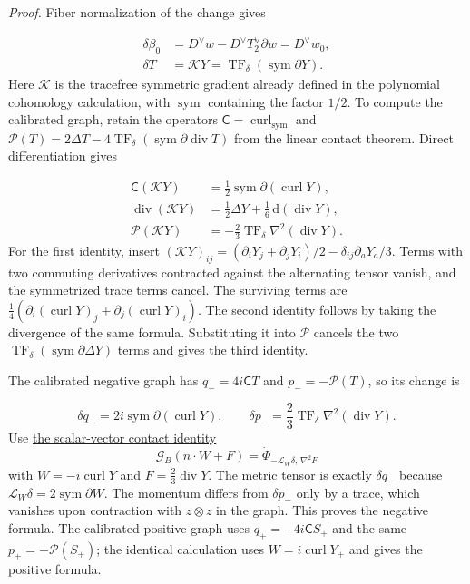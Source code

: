 \documentclass[
  english,
  11pt,
  reqno]{amsart}
\begin{document}
\emph{Proof.} Fiber normalization of the change gives

\label{eq:online-dual-primitive-quartic-change} \[
\begin{aligned}
\delta\beta_0
&=D^\vee w-D^\vee T_2^\vee\partial w
=D^\vee w_0,\\
\delta T&=\mathcal K Y
=\operatorname{TF}_\delta(\operatorname{sym}\partial Y).
\end{aligned}
\] Here \(\mathcal K\) is the tracefree symmetric gradient already
defined in the polynomial cohomology calculation, with
\(\operatorname{sym}\) containing the factor \(1/2\). To compute the
calibrated graph, retain the operators
\(\mathsf C=\operatorname{curl}_{\mathrm{sym}}\) and
\(\mathcal P(T)=2\Delta T-4\operatorname{TF}_\delta
(\operatorname{sym}\partial\operatorname{div}T)\) from the linear
contact theorem. Direct differentiation gives

\label{eq:online-dual-primitive-tensor-identities} \[
\begin{aligned}
\mathsf C(\mathcal K Y)
&=\frac12\operatorname{sym}\partial(\operatorname{curl}Y),\\
\operatorname{div}(\mathcal K Y)
&=\frac12\Delta Y+\frac16\,\mathrm d(\operatorname{div}Y),\\
\mathcal P(\mathcal K Y)
&=-\frac23\operatorname{TF}_\delta
                   \nabla^2(\operatorname{div}Y).
\end{aligned}
\] For the first identity, insert
\((\mathcal K Y)_{ij}=(\partial_iY_j+\partial_jY_i)/2
-\delta_{ij}\partial_aY_a/3\). Terms with two commuting derivatives
contracted against the alternating tensor vanish, and the symmetrized
trace terms cancel. The surviving terms are
\(\frac14(\partial_i(\operatorname{curl}Y)_j+
\partial_j(\operatorname{curl}Y)_i)\). The second identity follows by
taking the divergence of the same formula. Substituting it into
\(\mathcal P\) cancels the two
\(\operatorname{TF}_\delta(\operatorname{sym}\partial\Delta Y)\) terms
and gives the third identity.

The calibrated negative graph has \(q_-=4i\mathsf C T\) and
\(p_-=-\mathcal P(T)\), so its change is

\label{eq:online-dual-primitive-graph-tensor-change} \[
\delta q_-=2i\operatorname{sym}\partial(\operatorname{curl}Y),
\qquad
\delta p_-=\frac23\operatorname{TF}_\delta
                       \nabla^2(\operatorname{div}Y).
\] Use \hyperref[eq:online-contact-scalar-vector-gauge]{the
scalar-vector contact identity} \[
\mathcal G_B(n\cdot W+F)
=\dot\Phi_{-\mathcal L_W\delta,\,\nabla^2F}
\] with \(W=-i\operatorname{curl}Y\) and
\(F=\frac23\operatorname{div}Y\). The metric tensor is exactly
\(\delta q_-\) because
\(\mathcal L_W\delta=2\operatorname{sym}\partial W\). The momentum
differs from \(\delta p_-\) only by a trace, which vanishes upon
contraction with \(z\otimes z\) in the graph. This proves the negative
formula. The calibrated positive graph uses \(q_+=-4i\mathsf C S_+\) and
the same \(p_+=-\mathcal P(S_+)\); the identical calculation uses
\(W=i\operatorname{curl}Y_+\) and gives the positive formula.
\end{document}
